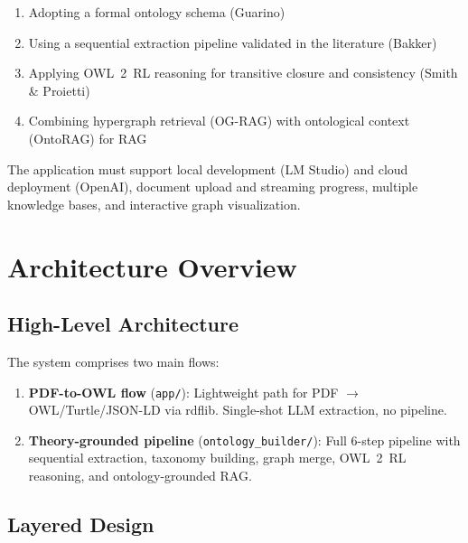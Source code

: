 \documentclass[11pt,a4paper]{article}
\begin{document}
\begin{enumerate}[noitemsep]
    \item Adopting a formal ontology schema (Guarino)
    \item Using a sequential extraction pipeline validated in the literature (Bakker)
    \item Applying OWL~2~RL reasoning for transitive closure and consistency (Smith \& Proietti)
    \item Combining hypergraph retrieval (OG-RAG) with ontological context (OntoRAG) for RAG
\end{enumerate}

The application must support local development (LM Studio) and cloud deployment (OpenAI), document upload and streaming progress, multiple knowledge bases, and interactive graph visualization.

\section{Architecture Overview}

\subsection{High-Level Architecture}

The system comprises two main flows:

\begin{enumerate}
    \item \textbf{PDF-to-OWL flow} (\texttt{app/}): Lightweight path for PDF $\rightarrow$ OWL/Turtle/JSON-LD via rdflib. Single-shot LLM extraction, no pipeline.
    \item \textbf{Theory-grounded pipeline} (\texttt{ontology\_builder/}): Full 6-step pipeline with sequential extraction, taxonomy building, graph merge, OWL~2~RL reasoning, and ontology-grounded RAG.
\end{enumerate}

\subsection{Layered Design}
\end{document}
